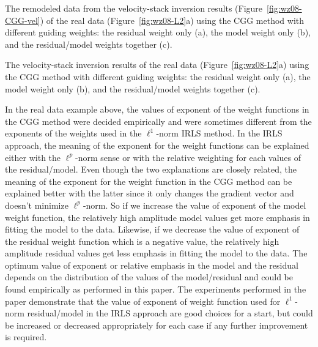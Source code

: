 {The remodeled data from the velocity-stack inversion results (Figure~\protect\ref{fig:wz08-CGG-vel}) 
of the real data (Figure~\protect\ref{fig:wz08-L2}a) using the CGG method with
different guiding weights: the residual weight only (a), the model weight only (b),
and the residual/model weights together (c).}

{The velocity-stack inversion results of the real data (Figure~\protect\ref{fig:wz08-L2}a) 
using the CGG method with
different guiding weights: the residual weight only (a), the model weight only (b),
and the residual/model weights together (c).}

In the real data example above,
the values of exponent of the weight functions in the CGG method
were decided empirically and were sometimes different from the exponents of the weights 
used in the $\ell^1$-norm IRLS method.
In the IRLS approach, the meaning of the exponent for the weight functions
can be explained either with the $\ell^p$-norm sense or
with the relative weighting for each values of the residual/model.
Even though the two explanations are closely related, 
the meaning of the exponent for the weight function in the CGG method
can be explained better with the latter since it only
changes the gradient vector and doesn't minimize $\ell^p$-norm.
So if we increase the value of exponent of the model weight function, 
the relatively high amplitude model values get more emphasis 
in fitting the model to the data.
Likewise, if we decrease the value of exponent of the residual weight function
which is a negative value, the relatively high amplitude residual values get less emphasis
in fitting the model to the data.
The optimum value of exponent or relative emphasis in the model and the residual
depends on the distribution of the values of the model/residual
and could be found empirically as performed in this paper.
The experiments performed in the paper demonstrate
that the value of exponent of weight function used for $\ell^1$-norm residual/model in the IRLS approach 
are good choices for a start, but could be increased or decreased appropriately for each case
if any further improvement is required.

